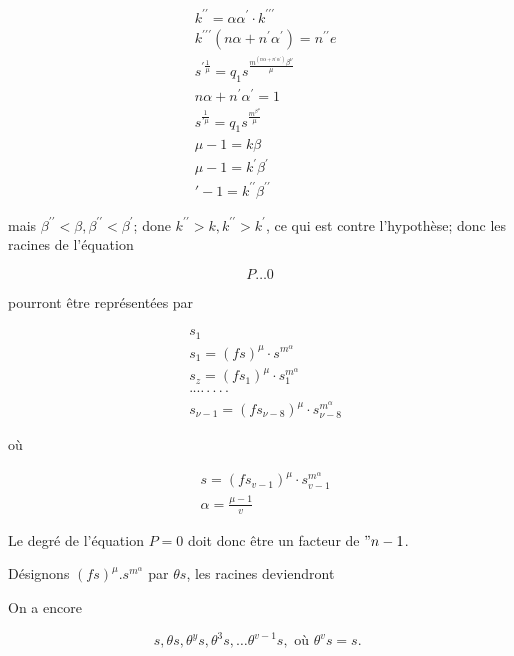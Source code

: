 \documentclass{article}
\begin{document}
\[
\begin{aligned}
& k^{\prime \prime}=\alpha \alpha^{\prime} \cdot k^{\prime \prime \prime} \\
& k^{\prime \prime \prime}\left(n \alpha+n^{\prime} \alpha^{\prime}\right)=n^{\prime \prime} e \\
& s^{\prime \frac{1}{\mu}}=q_{1} s^{\frac{m^{\left(n \alpha+n^{\prime} \alpha^{\prime}\right)} \beta^{\nu}}{\mu}} \\
& n \alpha+n^{\prime} \alpha^{\prime}=1 \\
& s^{\frac{1}{\prime \mu}}=q_{1} s^{\frac{m^{\beta^{\mu}}}{\mu}} \\
& \mu-1=k \beta \\
& \mu-1=k^{\prime} \beta^{\prime} \\
& \prime-1=k^{\prime \prime} \beta^{\prime \prime}
\end{aligned}
\]

mais \(\beta^{\prime \prime}<\beta, \beta^{\prime \prime}<\beta^{\prime}\); done \(k^{\prime \prime}>k, k^{\prime \prime}>k^{\prime}\), ce qui est contre l'hypothèse; donc les racines de l'équation

\[
P \ldots 0
\]

pourront être représentées par

\[
\begin{aligned}
& s_{1} \\
& s_{1}=(f s)^{\mu} \cdot s^{m^{\alpha}} \\
& s_{z}=\left(f s_{1}\right)^{\mu} \cdot s_{1}^{m^{\alpha}} \\
& \cdot \cdots \cdot \cdot \cdot \cdot \\
& s_{\nu-1}=\left(f s_{\nu-8}\right)^{\mu} \cdot s_{\nu-8}^{m^{\alpha}}
\end{aligned}
\]

où

\[
\begin{aligned}
& s=\left(f s_{v-1}\right)^{\mu} \cdot s_{v-1}^{m^{\alpha}} \\
& \alpha=\frac{\mu-1}{v}
\end{aligned}
\]

Le degré de l'équation \(P=0\) doit donc être un facteur de \(" n-1\).

Désignons \((f s)^{\mu} . s^{m^{\alpha}}\) par \(\theta s\), les racines deviendront

On a encore

\[
s, \theta s, \theta^{y} s, \theta^{3} s, \ldots \theta^{v-1} s, \text { où } \theta^{v} s=s \text {. }
\]
\end{document}
